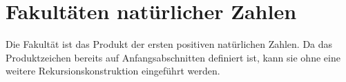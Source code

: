 \documentclass[main.tex]{subfiles}
\begin{document}
\begin{tabproof}
\end{tabproof}

\section{Fakultäten natürlicher Zahlen}

Die Fakultät ist das Produkt der ersten positiven natürlichen Zahlen. Da
das Produktzeichen bereits auf Anfangsabschnitten definiert ist, kann sie
ohne eine weitere Rekursionskonstruktion eingeführt werden.

\noindent\begin{minipage}{\linewidth}
\end{minipage}\par
\end{document}

